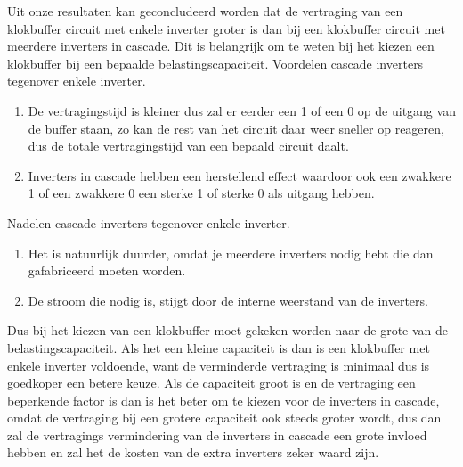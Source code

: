 
Uit onze resultaten kan geconcludeerd worden dat de vertraging van een klokbuffer circuit met enkele inverter groter is dan bij een klokbuffer circuit met meerdere inverters in cascade. Dit is belangrijk om te weten bij het kiezen een klokbuffer bij een bepaalde belastingscapaciteit. 
Voordelen cascade inverters tegenover enkele inverter.
\begin{enumerate}
\item De vertragingstijd is kleiner dus zal er eerder een 1 of een 0 op de uitgang van de buffer staan, zo kan de rest van het circuit daar weer sneller op reageren, dus de totale vertragingstijd van een bepaald circuit daalt.
\item Inverters in cascade hebben een herstellend effect waardoor ook een zwakkere 1 of een zwakkere 0 een sterke 1 of sterke 0 als uitgang hebben. 
\end {enumerate}
Nadelen cascade inverters tegenover enkele inverter.
\begin{enumerate}
\item Het is natuurlijk duurder, omdat je meerdere inverters nodig hebt die dan gafabriceerd moeten worden.
\item De stroom die nodig is, stijgt door de interne weerstand van de inverters.
\end {enumerate}

Dus bij het kiezen van een klokbuffer moet gekeken worden naar de grote van de belastingscapaciteit. Als het een kleine capaciteit is dan is een klokbuffer met enkele inverter voldoende, want de verminderde vertraging is minimaal dus is goedkoper een betere keuze.
Als de capaciteit groot is en de vertraging een beperkende factor is dan is het beter om te kiezen voor de inverters in cascade, omdat de vertraging bij een grotere capaciteit ook steeds groter wordt, dus dan zal de vertragings vermindering van de inverters in cascade een grote invloed hebben en zal het de kosten van de extra inverters zeker waard zijn.   